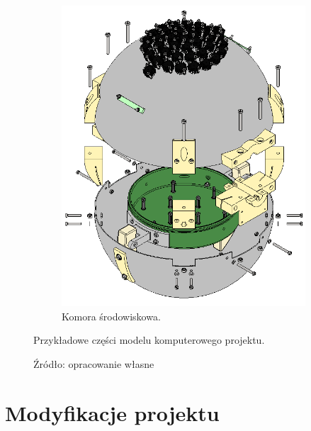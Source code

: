 \begin{figure}
\begin{subfigure}[b]{.49\textwidth}
		\label{fig:czwórnik}
	\end{subfigure}\vspace{15mm}%
	
	\begin{subfigure}{.8\textwidth}
		\centering
		\includegraphics[scale=0.3]{Komora_tweaked_colors_exploded}
		\caption{Komora środowiskowa.} 
		\label{fig:komora}
	\end{subfigure}

	\caption{Przykładowe części modelu komputerowego projektu.}
	\caption*{Źródło: opracowanie własne}
	
\end{figure}


\section{Modyfikacje projektu}

